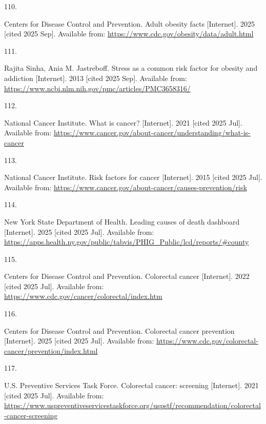 \documentclass[
  english,
  letterpaper,
]{report}
\newlength{\cslhangindent}
\newlength{\csllabelwidth}
\newenvironment{CSLReferences}[2] %
 {\begin{list}{}{%
  \setlength{\itemindent}{0pt}
  \setlength{\leftmargin}{0pt}
  \setlength{\parsep}{0pt}
  \ifodd #1
   \setlength{\leftmargin}{\cslhangindent}
   \setlength{\itemindent}{-1\cslhangindent}
  \fi
  \setlength{\itemsep}{#2\baselineskip}}}
 {\end{list}}
\newcommand{\CSLLeftMargin}[1]{\parbox[t]{\csllabelwidth}{\strut#1\strut}}
\newcommand{\CSLRightInline}[1]{\parbox[t]{\linewidth - \csllabelwidth}{\strut#1\strut}}
\begin{document}
\begin{CSLReferences}{0}{1}
\CSLLeftMargin{110. }%
\CSLRightInline{Centers for Disease Control and Prevention. Adult
obesity facts {[}Internet{]}. 2025 {[}cited 2025 Sep{]}. Available from:
\url{https://www.cdc.gov/obesity/data/adult.html}}

\CSLLeftMargin{111. }%
\CSLRightInline{Rajita Sinha, Ania M. Jastreboff. Stress as a common
risk factor for obesity and addiction {[}Internet{]}. 2013 {[}cited 2025
Sep{]}. Available from:
\url{https://www.ncbi.nlm.nih.gov/pmc/articles/PMC3658316/}}

\CSLLeftMargin{112. }%
\CSLRightInline{National Cancer Institute. What is cancer?
{[}Internet{]}. 2021 {[}cited 2025 Jul{]}. Available from:
\url{https://www.cancer.gov/about-cancer/understanding/what-is-cancer}}

\CSLLeftMargin{113. }%
\CSLRightInline{National Cancer Institute. Risk factors for cancer
{[}Internet{]}. 2015 {[}cited 2025 Jul{]}. Available from:
\url{https://www.cancer.gov/about-cancer/causes-prevention/risk}}

\CSLLeftMargin{114. }%
\CSLRightInline{New York State Department of Health. Leading causes of
death dashboard {[}Internet{]}. 2025 {[}cited 2025 Jul{]}. Available
from:
\url{https://apps.health.ny.gov/public/tabvis/PHIG_Public/lcd/reports/\#county}}

\CSLLeftMargin{115. }%
\CSLRightInline{Centers for Disease Control and Prevention. Colorectal
cancer {[}Internet{]}. 2022 {[}cited 2025 Jul{]}. Available from:
\url{https://www.cdc.gov/cancer/colorectal/index.htm}}

\CSLLeftMargin{116. }%
\CSLRightInline{Centers for Disease Control and Prevention. Colorectal
cancer prevention {[}Internet{]}. 2025 {[}cited 2025 Jul{]}. Available
from: \url{https://www.cdc.gov/colorectal-cancer/prevention/index.html}}

\CSLLeftMargin{117. }%
\CSLRightInline{U.S. Preventive Services Task Force. Colorectal cancer:
screening {[}Internet{]}. 2021 {[}cited 2025 Jul{]}. Available from:
\url{https://www.uspreventiveservicestaskforce.org/uspstf/recommendation/colorectal-cancer-screening}}


\end{CSLReferences}
\end{document}
